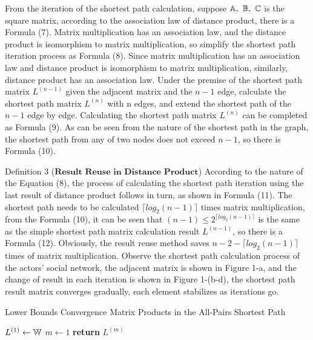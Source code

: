 \documentclass[review]{cvpr}
\begin{document}
From the iteration of the shortest path calculation, suppose \(\Bbb A,\ \Bbb B,\ \Bbb C\) is the square matrix, according to the association law of distance product, there is a Formula (7).
Matrix multiplication has an association law, and the distance product is isomorphism to matrix multiplication, so simplify the shortest path iteration process as Formula (8).
Since matrix multiplication has an association law and distance product is isomorphism to matrix multiplication, similarly, distance product has an association law.
Under the premise of the shortest path matrix $L^{(n-1)}$ given the adjacent matrix and the $n-1$ edge, calculate the shortest path matrix $L^{(n)}$ with n edges, and extend the shortest path of the $n-1$ edge by edge.
Calculating the shortest path matrix $L^{(n)}$ can be completed as Formula (9).
As can be seen from the nature of the shortest path in the graph, the shortest path from any of two nodes does not exceed $n-1$, so there is Formula (10).

Definition 3 ($\textbf{Result Reuse in Distance Product}$) According to the nature of the Equation (8), the process of calculating the shortest path iteration using the last result of distance product follows in turn, as shown in Formula (11).
The shortest path needs to be calculated $\lceil{log_2(n-1)}\rceil$ times matrix multiplication, from the Formula (10), it can be seen that $(n-1)\leq2^{\lceil{log_2(n-1)}\rceil}$ is the same as the simple shortest path matrix calculation result $L^{(n-1)}$, so there is a Formula (12).
Obviously, the result reuse method saves $n-2-\lceil{log_2(n-1)}\rceil$ times of matrix multiplication.
Observe the shortest path calculation process of the actors' social network, the adjacent matrix is shown in Figure 1-a, and the change of result in each iteration is shown in Figure 1-(b-d), the shortest path result matrix converges gradually, each element stabilizes as iterations go.


\begin{algorithm}
\caption{Lower Bounds Convergence Matrix Products in the All-Pairs Shortest Path}\label{algorithm}
  $L^{(1)}\leftarrow \Bbb W$\;
  $m\leftarrow 1$\;
  {\bf return} $L^{(m)}$\;
\end{algorithm}
\end{document}
